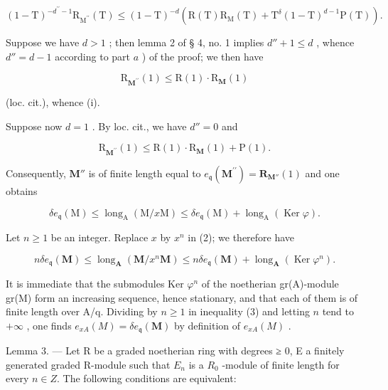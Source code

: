 \[
(1 - \mathrm{T}) ^ {- d ^ {\prime \prime} - 1} \mathrm{R} _ {\mathrm{M} ^ {\prime \prime}} (\mathrm{T}) \leqslant (1 - \mathrm{T}) ^ {- d} \left(\mathrm{R} (\mathrm{T}) \mathrm{R} _ {\mathrm{M}} (\mathrm{T}) + \mathrm{T} ^ {\delta} (1 - \mathrm{T}) ^ {d - 1} \mathrm{P} (\mathrm{T})\right).
\]

Suppose we have \(d > 1\) ; then lemma 2 of § 4, no. 1 implies \(d'' + 1 \leqslant d\) , whence \(d'' = d - 1\) according to part \(a\) ) of the proof; we then have

\[
\mathrm{R} _ {\mathbf {M} ^ {\prime \prime}} (1) \leqslant \mathrm{R} (1)\cdot \mathrm{R} _ {\mathbf {M}} (1)
\]

(loc. cit.), whence (i).

Suppose now \(d=1\) . By loc. cit., we have \(d''=0\) and

\[
\mathrm{R} _ {\mathbf {M} ^ {\prime \prime}} (1) \leqslant \mathrm{R} (1)\cdot \mathrm{R} _ {\mathbf {M}} (1) + \mathrm{P} (1).
\]

Consequently, \(\mathbf{M}''\) is of finite length equal to \(e_{\mathfrak{q}}(\mathbf{M}^{\prime \prime}) = \mathbf{R}_{\mathbf{M}''}(1)\) and one obtains

\[
\delta e _ {\mathfrak {q}} (\mathrm{M}) \leqslant \operatorname{long} _ {\mathrm{A}} (\mathrm{M} / x \mathrm{M}) \leqslant \delta e _ {\mathfrak {q}} (\mathrm{M}) + \operatorname{long} _ {\mathrm{A}} (\operatorname{Ker} \varphi).\tag{2}
\]

Let \(n \geqslant 1\) be an integer. Replace \(x\) by \(x^n\) in (2); we therefore have

\[
n \delta e _ {\mathfrak{q}} (\mathbf {M}) \leqslant \operatorname{long} _ {\mathbf {A}} (\mathbf {M} / x ^ {n} \mathbf {M}) \leqslant n \delta e _ {\mathfrak{q}} (\mathbf {M}) + \operatorname{long} _ {\mathbf {A}} (\operatorname{Ker} \varphi^ {n}).\tag{3}
\]

It is immediate that the submodules Ker \(\varphi^{n}\) of the noetherian gr(A)-module gr(M) form an increasing sequence, hence stationary, and that each of them is of finite length over A/q. Dividing by \(n \geqslant 1\) in inequality (3) and letting \(n\) tend to \(+\infty\) , one finds \(e_{xA}(M) = \delta e_{\mathfrak{q}}(\mathbf{M})\) by definition of \(e_{xA}(M)\) .

Lemma 3. — Let R be a graded noetherian ring with degrees ≥ 0, E a finitely generated graded R-module such that \(E_{n}\) is a \(R_{0}\) -module of finite length for every \(n \in Z\). The following conditions are equivalent:

